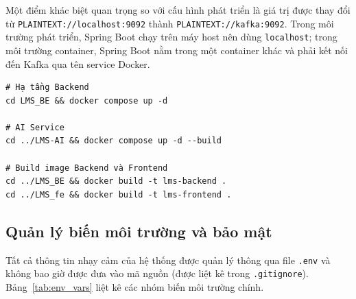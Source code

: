 Một điểm khác biệt quan trọng so với cấu hình phát triển là giá trị
 được thay đổi từ
\texttt{PLAINTEXT://localhost:9092} thành \texttt{PLAINTEXT://kafka:9092}.
Trong môi trường phát triển, Spring Boot chạy trên máy host nên dùng
\texttt{localhost}; trong môi trường container, Spring Boot nằm trong một
container khác và phải kết nối đến Kafka qua tên service Docker.

\begin{verbatim}
# Hạ tầng Backend
cd LMS_BE && docker compose up -d

# AI Service
cd ../LMS-AI && docker compose up -d --build

# Build image Backend và Frontend
cd ../LMS_BE && docker build -t lms-backend .
cd ../LMS_fe && docker build -t lms-frontend .
\end{verbatim}

\subsection{Quản lý biến môi trường và bảo mật}

Tất cả thông tin nhạy cảm của hệ thống được quản lý thông qua file \texttt{.env}
và không bao giờ được đưa vào mã nguồn (được liệt kê trong \texttt{.gitignore}).
Bảng~\ref{tab:env_vars} liệt kê các nhóm biến môi trường chính.

